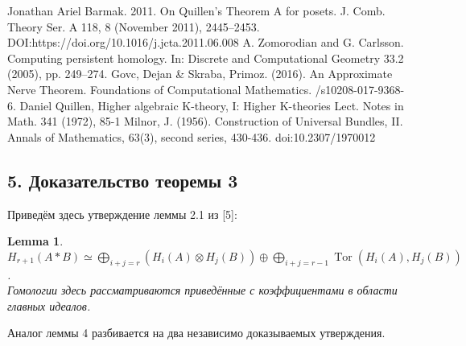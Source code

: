\documentclass[a4paper, 12pt]{article}
\newtheorem{lemma}{Lemma}
\theoremstyle{definition}
\theoremstyle{remark}
\begin{document}
\begin{enumerate}
  Jonathan Ariel Barmak. 2011.
  \newblock On Quillen’s Theorem A for posets.
  \newblock J. Comb. Theory Ser. A 118, 8 (November 2011), 2445–2453.
  \newblock DOI:https://doi.org/10.1016/j.jcta.2011.06.008
  A. Zomorodian and G. Carlsson.
  \newblock Computing persistent homology.
  \newblock In: Discrete and Computational Geometry 33.2 (2005), pp. 249–274.
  Govc, Dejan \& Skraba, Primoz. (2016).
  \newblock An Approximate Nerve Theorem.
  \newblock Foundations of Computational Mathematics.
  /s10208-017-9368-6.
  Daniel Quillen,
  \newblock Higher algebraic K-theory, I: Higher K-theories Lect.
  \newblock Notes in Math. 341 (1972), 85-1
  Milnor, J. (1956).
  \newblock Construction of Universal Bundles, II.
  \newblock Annals of Mathematics, 63(3), second series, 430-436.
  \newblock doi:10.2307/1970012
\end{enumerate}

\subsection*{5. Доказательство теоремы 3}

Приведём здесь утверждение леммы 2.1 из [5]:\\
\begin{lemma}
  $H_{r+1}(A * B) \simeq \bigoplus_{i+j=r}(H_i(A) \otimes H_j(B)) \oplus \bigoplus_{i+j=r-1} \operatorname{Tor}(H_i(A),H_j(B))$.\\
  Гомологии здесь рассматриваются приведённые с коэффициентами в области главных идеалов.
\end{lemma}

Аналог леммы 4 разбивается на два независимо доказываемых утверждения.\\
\end{document}
